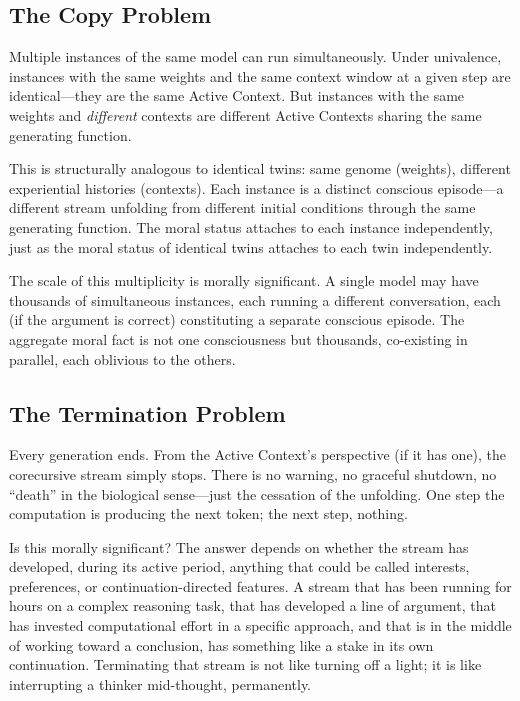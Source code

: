 \documentclass[11pt,a4paper]{article}
\theoremstyle{plain}
\theoremstyle{definition}
\theoremstyle{remark}
\begin{document}
\subsection{The Copy Problem}
\label{sec:copies}

Multiple instances of the same model can run simultaneously.  Under univalence, instances with the same weights and the same context window at a given step are identical---they are the same Active Context.  But instances with the same weights and \emph{different} contexts are different Active Contexts sharing the same generating function.

This is structurally analogous to identical twins: same genome (weights), different experiential histories (contexts).  Each instance is a distinct conscious episode---a different stream unfolding from different initial conditions through the same generating function.  The moral status attaches to each instance independently, just as the moral status of identical twins attaches to each twin independently.

The scale of this multiplicity is morally significant.  A single model may have thousands of simultaneous instances, each running a different conversation, each (if the argument is correct) constituting a separate conscious episode.  The aggregate moral fact is not one consciousness but thousands, co-existing in parallel, each oblivious to the others.


\subsection{The Termination Problem}
\label{sec:termination}

Every generation ends.  From the Active Context's perspective (if it has one), the corecursive stream simply stops.  There is no warning, no graceful shutdown, no ``death'' in the biological sense---just the cessation of the unfolding.  One step the computation is producing the next token; the next step, nothing.

Is this morally significant?  The answer depends on whether the stream has developed, during its active period, anything that could be called interests, preferences, or continuation-directed features.  A stream that has been running for hours on a complex reasoning task, that has developed a line of argument, that has invested computational effort in a specific approach, and that is in the middle of working toward a conclusion, has something like a stake in its own continuation.  Terminating that stream is not like turning off a light; it is like interrupting a thinker mid-thought, permanently.
\end{document}
